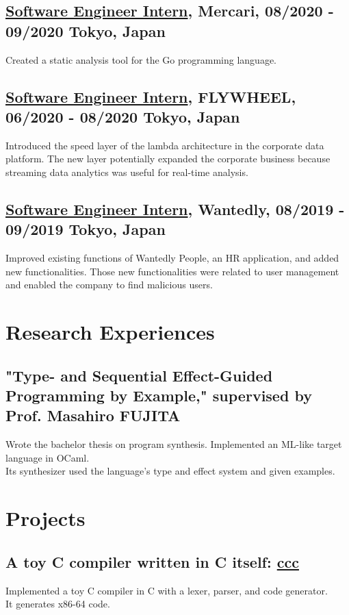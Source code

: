 \documentclass[10pt]{article}
\begin{document}
  \subsection*{\underline{Software Engineer Intern}, Mercari, 08/2020 - 09/2020 \hfill Tokyo, Japan}
    Created a static analysis tool for the Go programming language.
  \subsection*{\underline{Software Engineer Intern}, FLYWHEEL, 06/2020 - 08/2020 \hfill Tokyo, Japan}
    Introduced the speed layer of the lambda architecture in the corporate data platform.
    The new layer potentially expanded the corporate business because streaming data analytics was useful for real-time analysis.
  \subsection*{\underline{Software Engineer Intern}, Wantedly, 08/2019 - 09/2019 \hfill Tokyo, Japan}
    Improved existing functions of Wantedly People, an HR application, and added new functionalities.
    Those new functionalities were related to user management and enabled the company to find malicious users.

\section*{Research Experiences}
  \subsection*{"Type- and Sequential Effect-Guided Programming by Example," supervised by Prof. Masahiro FUJITA}
    Wrote the bachelor thesis on program synthesis.
    Implemented an ML-like target language in OCaml.
    \\
    Its synthesizer used the language's type and effect system and given examples.

\section*{Projects}
  \subsection*{A toy C compiler written in C itself: \href{https://github.com/diohabara/ccc}{ccc}}
    Implemented a toy C compiler in C with a lexer, parser, and code generator.
    \\
    It generates x86-64 code.
\end{document}
